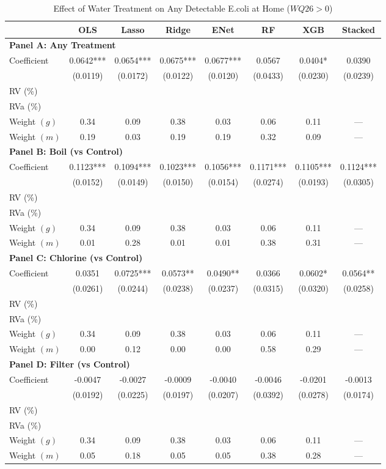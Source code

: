 \begin{table}[htbp]
\centering
\caption{Effect of Water Treatment on Any Detectable E.coli at Home ($WQ26>0$)}
\label{tab:some_risk_home_full}
\begin{tabular}{lccccccc}
\toprule
 & OLS & Lasso & Ridge & ENet & RF & XGB & Stacked \\
\midrule
\multicolumn{8}{l}{\textbf{Panel A: Any Treatment}} \\
\midrule
Coefficient & 0.0642*** & 0.0654*** & 0.0675*** & 0.0677*** & 0.0567 & 0.0404* & 0.0390 \\
 & (0.0119) & (0.0172) & (0.0122) & (0.0120) & (0.0433) & (0.0230) & (0.0239) \\
RV (\%) \\
RVa (\%) \\
Weight $(g)$ & 0.34 & 0.09 & 0.38 & 0.03 & 0.06 & 0.11 & — \\
Weight $(m)$ & 0.19 & 0.03 & 0.19 & 0.19 & 0.32 & 0.09 & — \\

\multicolumn{8}{l}{\textbf{Panel B: Boil (vs Control)}} \\
\midrule
Coefficient & 0.1123*** & 0.1094*** & 0.1023*** & 0.1056*** & 0.1171*** & 0.1105*** & 0.1124*** \\
 & (0.0152) & (0.0149) & (0.0150) & (0.0154) & (0.0274) & (0.0193) & (0.0305) \\
RV (\%) \\
RVa (\%) \\
Weight $(g)$ & 0.34 & 0.09 & 0.38 & 0.03 & 0.06 & 0.11 & — \\
Weight $(m)$ & 0.01 & 0.28 & 0.01 & 0.01 & 0.38 & 0.31 & — \\

\multicolumn{8}{l}{\textbf{Panel C: Chlorine (vs Control)}} \\
\midrule
Coefficient & 0.0351 & 0.0725*** & 0.0573** & 0.0490** & 0.0366 & 0.0602* & 0.0564** \\
 & (0.0261) & (0.0244) & (0.0238) & (0.0237) & (0.0315) & (0.0320) & (0.0258) \\
RV (\%) \\
RVa (\%) \\
Weight $(g)$ & 0.34 & 0.09 & 0.38 & 0.03 & 0.06 & 0.11 & — \\
Weight $(m)$ & 0.00 & 0.12 & 0.00 & 0.00 & 0.58 & 0.29 & — \\

\multicolumn{8}{l}{\textbf{Panel D: Filter (vs Control)}} \\
\midrule
Coefficient & -0.0047 & -0.0027 & -0.0009 & -0.0040 & -0.0046 & -0.0201 & -0.0013 \\
 & (0.0192) & (0.0225) & (0.0197) & (0.0207) & (0.0392) & (0.0278) & (0.0174) \\
RV (\%) \\
RVa (\%) \\
Weight $(g)$ & 0.34 & 0.09 & 0.38 & 0.03 & 0.06 & 0.11 & — \\
Weight $(m)$ & 0.05 & 0.18 & 0.05 & 0.05 & 0.38 & 0.28 & — \\


\end{tabular}
\end{table}
